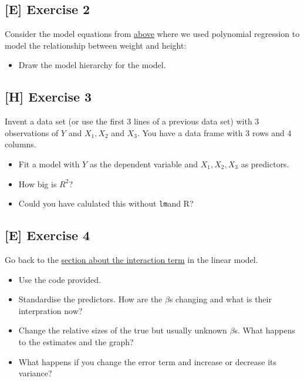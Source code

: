 \documentclass[
]{book}
\providecommand{\tightlist}{%
  \setlength{\itemsep}{0pt}\setlength{\parskip}{0pt}}
\begin{document}
\subsection{{[}E{]} Exercise 2}\label{exercise2_multiple_regression}

Consider the model equations from \hyperref[adding_transformed_predictor]{above}
where we used polynomial regression to model the relationship between
weight and height:

\begin{itemize}
\tightlist
\item
  Draw the model hierarchy for the model.
\end{itemize}

\subsection{{[}H{]} Exercise 3}\label{exercise3_multiple_regression}

Invent a data set (or use the first 3 lines of a previous data set)
with 3 observations of \(Y\) and \(X_1, X_2\) and \(X_3\). You have a data frame
with 3 rows and 4 columns.

\begin{itemize}
\tightlist
\item
  Fit a model with \(Y\) as the dependent variable and \(X_1, X_2, X_3\) as predictors.
\item
  How big is \(R^2\)?
\item
  Could you have calulated this without \texttt{lm}and R?
\end{itemize}

\subsection{{[}E{]} Exercise 4}\label{exercise4_multiple_regression}

Go back to the \hyperref[interaction_term]{section about the interaction term} in the linear model.

\begin{itemize}
\tightlist
\item
  Use the code provided.
\item
  Standardise the predictors. How are the \(\beta\)s changing and what is their interpration now?
\item
  Change the relative sizes of the true but usually unknown \(\beta\)s.
  What happens to the estimates and the graph?
\item
  What happens if you change the error term and increase or decrease its variance?
\end{itemize}
\end{document}
